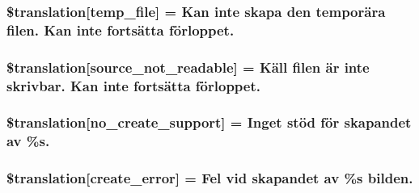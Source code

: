 \subsubsection[{\$translation}]{\setlength{\rightskip}{0pt plus 5cm}\$translation\mbox{[}\textquotesingle{}temp\+\_\+file\textquotesingle{}\mbox{]} = \textquotesingle{}Kan inte skapa den temporära filen. Kan inte fortsätta förloppet.\textquotesingle{}}\label{class_8upload_8sv___s_e_8php_a2baece8da11e20d45175db91851ec3e3}
\hypertarget{class_8upload_8sv___s_e_8php_a922967ca2df0efdd455261142d8e5715}{}
\subsubsection[{\$translation}]{\setlength{\rightskip}{0pt plus 5cm}\$translation\mbox{[}\textquotesingle{}source\+\_\+not\+\_\+readable\textquotesingle{}\mbox{]} = \textquotesingle{}Käll filen är inte skrivbar. Kan inte fortsätta förloppet.\textquotesingle{}}\label{class_8upload_8sv___s_e_8php_a922967ca2df0efdd455261142d8e5715}
\hypertarget{class_8upload_8sv___s_e_8php_a346dfd1ade29f583dd20d345c436859f}{}
\subsubsection[{\$translation}]{\setlength{\rightskip}{0pt plus 5cm}\$translation\mbox{[}\textquotesingle{}no\+\_\+create\+\_\+support\textquotesingle{}\mbox{]} = \textquotesingle{}Inget stöd för skapandet av \%s.\textquotesingle{}}\label{class_8upload_8sv___s_e_8php_a346dfd1ade29f583dd20d345c436859f}
\hypertarget{class_8upload_8sv___s_e_8php_a53013ce9255c4e1849098ddd9fdb2b3f}{}
\subsubsection[{\$translation}]{\setlength{\rightskip}{0pt plus 5cm}\$translation\mbox{[}\textquotesingle{}create\+\_\+error\textquotesingle{}\mbox{]} = \textquotesingle{}Fel vid skapandet av \%s bilden.\textquotesingle{}}\label{class_8upload_8sv___s_e_8php_a53013ce9255c4e1849098ddd9fdb2b3f}
\hypertarget{class_8upload_8sv___s_e_8php_a6ab0a660b457eaf2d3434b225449fdd6}{}
